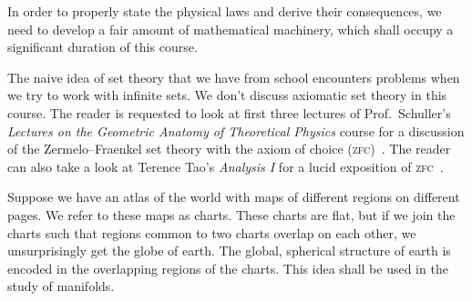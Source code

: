 \documentclass[a4 paper, 12pt]{book}
\theoremstyle{definition}
\begin{document}
    In order to properly state the physical laws and derive their consequences, we need to develop a fair amount of mathematical machinery, which shall occupy a significant duration of this course.

    The naive idea of set theory that we have from school encounters problems when we try to work with infinite sets. We don't discuss axiomatic set theory in this course. The reader is requested to look at first three lectures of Prof.\ Schuller's \textit{Lectures on the Geometric Anatomy of Theoretical Physics} course for a discussion of the Zermelo--Fraenkel set theory with the axiom of choice (\textsc{zfc})~\cite{Schuller_geometric_videos}. The reader can also take a look at Terence Tao's \textit{Analysis I} for a lucid exposition of \textsc{zfc}~\cite{Tao}.

    Suppose we have an atlas of the world with maps of different regions on different pages. We refer to these maps as charts. These charts are flat, but if we join the charts such that regions common to two charts overlap on each other, we unsurprisingly get the globe of earth. The global, spherical structure of earth is encoded in the overlapping regions of the charts. This idea shall be used in the study of manifolds.
\end{document}
